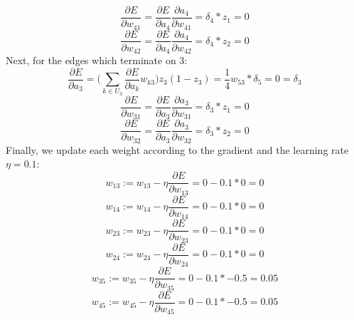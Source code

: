 \documentclass{article}
\begin{document}
\begin{enumerate}
            $$ \frac{\partial E}{\partial w_{41}} = \frac{\partial E}{\partial a_4} \frac{\partial a_4}{\partial w_{41}}
                = \delta_4 * z_1 = 0 $$
            $$ \frac{\partial E}{\partial w_{42}} = \frac{\partial E}{\partial a_4} \frac{\partial a_4}{\partial w_{42}}
                = \delta_4 * z_2 = 0 $$
            Next, for the edges which terminate on 3:
            $$ \frac{\partial E}{\partial a_3} = \Bigg( \sum_{k \in U_3} \frac{\partial E}{\partial a_k} w_{k3}\Bigg)  z_3 (1 - z_3)
                = \frac{1}{4} w_{53} * \delta_5 = 0 = \delta_3 $$
            $$ \frac{\partial E}{\partial w_{31}} = \frac{\partial E}{\partial a_3} \frac{\partial a_3}{\partial w_{31}}
                = \delta_3 * z_1 = 0 $$
            $$ \frac{\partial E}{\partial w_{32}} = \frac{\partial E}{\partial a_3} \frac{\partial a_3}{\partial w_{32}}
                = \delta_3 * z_2 = 0 $$
            Finally, we update each weight according to the gradient and the learning rate $\eta = 0.1$:
            $$ w_{13} := w_{13} - \eta \frac{\partial E}{\partial w_{13}} = 0 - 0.1 * 0  = 0 $$
            $$ w_{14} := w_{14} - \eta \frac{\partial E}{\partial w_{14}} = 0 - 0.1 * 0  = 0 $$
            $$ w_{23} := w_{23} - \eta \frac{\partial E}{\partial w_{23}} = 0 - 0.1 * 0  = 0 $$
            $$ w_{24} := w_{24} - \eta \frac{\partial E}{\partial w_{24}} = 0 - 0.1 * 0  = 0 $$
            $$ w_{35} := w_{35} - \eta \frac{\partial E}{\partial w_{35}} = 0 - 0.1 * -0.5  = 0.05 $$
            $$ w_{45} := w_{45} - \eta \frac{\partial E}{\partial w_{45}} = 0 - 0.1 * -0.5  = 0.05 $$
\end{enumerate}
\end{document}
